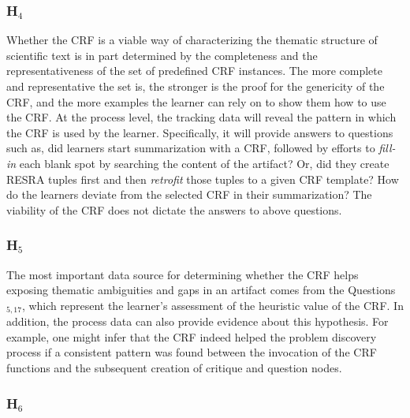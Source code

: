 \subsubsection{H\(_4\)}
\label{sec:resra4 data}

Whether the CRF is a viable way of characterizing the thematic structure of
scientific text is in part determined by the completeness and the
representativeness of the set of predefined CRF instances. The more
complete and representative the set is, the stronger is the proof for the
genericity of the CRF, and the more examples the learner can rely on to
show them how to use the CRF. At the process level, the tracking data will
reveal the pattern in which the CRF is used by the learner. Specifically,
it will provide answers to questions such as, did learners start
summarization with a CRF, followed by efforts to {\it fill-in\/} each blank
spot by searching the content of the artifact? Or, did they create RESRA
tuples first and then {\it retrofit\/} those tuples to a given CRF template?
How do the learners deviate from the selected CRF in their summarization?
The viability of the CRF does not dictate the answers to above questions.


\subsubsection{H\(_5\)}
\label{sec:resra5 data}

The most important data source for determining whether the CRF helps
exposing thematic ambiguities and gaps in an artifact comes from the
Questions\(_{5,17}\), which represent the learner's assessment of the
heuristic value of the CRF. In addition, the process data can also provide
evidence about this hypothesis. For example, one might infer that the CRF
indeed helped the problem discovery process if a consistent pattern was
found between the invocation of the CRF functions and the subsequent
creation of critique and question nodes.


\subsubsection{H\(_6\)}
\label{sec:resra6 data}

